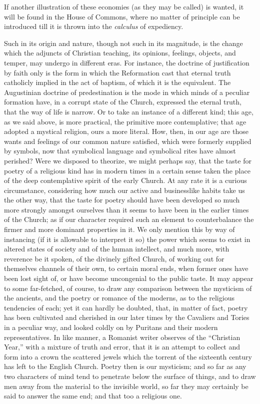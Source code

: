 If another illustration of these economies (as
they may be called) is wanted, it will be found in the House of
Commons, where no matter of principle can be introduced till it is
thrown into the \emph{calculus} of expediency.

Such in its origin and nature, though not such in
its magnitude, is the change which the adjuncts of Christian teaching,
its opinions, feelings, objects, and temper, may undergo in different
eras. For instance, the doctrine of justification by faith only is the
form in which the Reformation cast that eternal truth catholicly
implied in the act of baptism, of which it is the equivalent. The
Augustinian doctrine of predestination is the mode in which minds of a
peculiar formation have, in a corrupt state of the Church, expressed
the eternal truth, that the way of life is narrow. Or to take an
instance of a different kind; this age, as we said above, is more
practical, the primitive more contemplative; that age adopted a
mystical religion, ours a more literal. How, then, in our age are
those wants and feelings of our common nature satisfied, which were
formerly supplied by symbols, now that symbolical language and
symbolical rites have almost perished? Were we disposed to theorize,
we might perhaps say, that the taste for poetry of a religious kind
has in modern times in a certain sense taken the place of the deep
contemplative spirit of the early Church. At any rate it is a curious
circumstance, considering how much our active and businesslike habits
take us the other way, that the taste for poetry should have been
developed so much more strongly amongst ourselves than it seems to
have been in the earlier times of the Church; as if our character
required such an element to counterbalance the firmer and more
dominant properties in it. We only mention this by way of instancing
(if it is allowable to interpret it so) the power which seems to
exist in altered states of society and of the human intellect, and
much more, with reverence be it spoken, of the divinely gifted Church,
of working out for themselves channels of their own, to certain moral
ends, when former ones have been lost sight of, or have become
uncongenial to the public taste. It may appear to some far-fetched, of
course, to draw any comparison between the mysticism of the ancients,
and the poetry or romance of the moderns, as to the religious
tendencies of each; yet it can hardly be doubted, that, in matter of
fact, poetry has been cultivated and cherished in our later times by
the Cavaliers and Tories in a peculiar way, and looked coldly on by
Puritans and their modern representatives. In like manner, a Romanist
writer observes of the ``Christian Year,'' with a mixture of truth and
error, that it is an attempt to collect and form into a crown the
scattered jewels which the torrent of the sixteenth century has left
to the English Church. Poetry then is our mysticism; and so far as any
two characters of mind tend to penetrate below the surface of things,
and to draw men away from the material to the invisible world, so far
they may certainly be said to answer the same end; and that too a
religious one.

